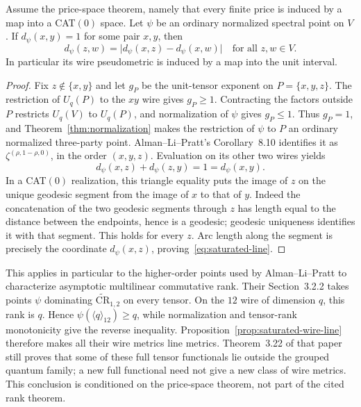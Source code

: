 \begin{proposition}
\label{prop:saturated-wire-line}
Assume the price-space theorem, namely that every finite price is induced by a map into a CAT$(0)$ space.  Let $\psi$ be an ordinary normalized spectral point on $V$.  If $d_\psi(x,y)=1$ for some pair $x,y$, then
\begin{equation}
 d_\psi(z,w)=\bigl|d_\psi(x,z)-d_\psi(x,w)\bigr|
 \quad\text{for all }z,w\in V.
 \label{eq:saturated-line}
\end{equation}
In particular its wire pseudometric is induced by a map into the unit interval.
\end{proposition}
\begin{proof}
Fix $z\notin\{x,y\}$ and let $g_P$ be the unit-tensor exponent on $P=\{x,y,z\}$.  The restriction of $U_q(P)$ to the $xy$ wire gives $g_P\geq1$.  Contracting the factors outside $P$ restricts $U_q(V)$ to $U_q(P)$, and normalization of $\psi$ gives $g_P\leq1$.  Thus $g_P=1$, and Theorem~\ref{thm:normalization} makes the restriction of $\psi$ to $P$ an ordinary normalized three-party point.  Alman--Li--Pratt's Corollary~8.10 identifies it as $\zeta^{(\rho,1-\rho,0)}$, in the order $(x,y,z)$.  Evaluation on its other two wires yields
\[
 d_\psi(x,z)+d_\psi(z,y)=1=d_\psi(x,y).
\]
In a CAT$(0)$ realization, this triangle equality puts the image of $z$ on the unique geodesic segment from the image of $x$ to that of $y$.  Indeed the concatenation of the two geodesic segments through $z$ has length equal to the distance between the endpoints, hence is a geodesic; geodesic uniqueness identifies it with that segment.  This holds for every $z$.  Arc length along the segment is precisely the coordinate $d_\psi(x,z)$, proving~\eqref{eq:saturated-line}.
\end{proof}

This applies in particular to the higher-order points used by Alman--Li--Pratt to characterize asymptotic multilinear commutative rank.  Their Section~3.2.2 takes points $\psi$ dominating $\widetilde{\mathrm{CR}}_{1,2}$ on every tensor.  On the $12$ wire of dimension $q$, this rank is $q$.  Hence $\psi(\langle q\rangle_{12})\geq q$, while normalization and tensor-rank monotonicity give the reverse inequality.  Proposition~\ref{prop:saturated-wire-line} therefore makes all their wire metrics line metrics.  Theorem~3.22 of that paper still proves that some of these full tensor functionals lie outside the grouped quantum family; a new full functional need not give a new class of wire metrics.  This conclusion is conditioned on the price-space theorem, not part of the cited rank theorem.

